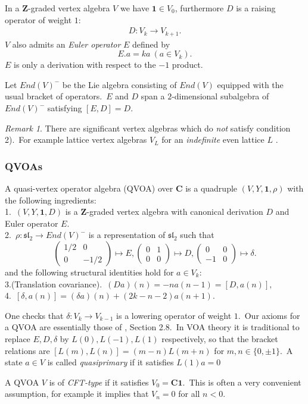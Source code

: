 \documentclass[12pt]{amsart}
\theoremstyle{plain}
\theoremstyle{definition}
\theoremstyle{remark}
\newtheorem{rmk}[thm]{Remark}
\providecommand{\stwomat}[4]{\left(\begin{smallmatrix}#1&#2\\#3&#4\end{smallmatrix}\right)}
\newcommand{\CC}{\mathbf{C}}
\newcommand{\ZZ}{\mathbf{Z}}
\begin{document}
\medskip
In a $\ZZ$-graded vertex algebra $V$ we have $\mathbf{1}\in V_0$, furthermore $D$ is a raising operator of weight $1$:
\begin{eqnarray*}
D: V_k\rightarrow V_{k+1}.
\end{eqnarray*}
$V$ also admits an \textit{Euler operator} $E$ defined by
$$ E.a = ka\ (a\in V_k).$$
$E$ is only a derivation with respect to the $-1$ product.

\medskip
 Let $End(V)^-$ be the Lie algebra consisting of $End(V)$ equipped with the usual bracket of operators.\  $E$ and $D$ span a $2$-dimensional subalgebra of $End(V)^-$ satisfying
$[E, D]=D.$\ 

\begin{rmk}
There are significant vertex algebras which do \textit{not} satisfy  condition 2).\
For example lattice vertex algebras $V_L$ for an \textit{indefinite} even lattice $L$ \cite{LepowskyLi}.
\end{rmk}
\subsubsection{QVOAs}\label{SSQVOA} A quasi-vertex operator algebra (QVOA) over $\CC$ is a quadruple $(V, Y, \mathbf{1}, \rho)$ with the following ingredients:\\
1.\ $(V, Y, \mathbf{1}, D)$ is a $\ZZ$-graded vertex algebra with canonical derivation $D$ and Euler operator $E$.\\
2.\ $\rho: \mathfrak{sl}_2\rightarrow End(V)^-$ is a representation of $\mathfrak{sl}_2$
such that 
$$\stwomat{1/2}{0}{0}{-1/2}\mapsto E, 
\stwomat{0}{1}{0}{0}\mapsto D,
\stwomat{0}{0}{-1}{0}\mapsto \delta.$$
and the following structural identities hold for $a\in V_k$:\\
3.(Translation covariance).\ $(Da)(n)= -na(n-1)=[D, a(n)],$\\
4.\   $[\delta, a(n)] = (\delta a)(n)+(2k-n-2)a(n+1)$.

\medskip
 One checks that $\delta: V_k\rightarrow V_{k-1}$ is a lowering operator of weight $1$.\
  Our axioms for a QVOA are essentially those of \cite{FHL}, Section 2.8.\
 In VOA theory it is traditional to replace
 $E, D, \delta$ by $L(0), L(-1), L(1)$ respectively, so that the bracket relations are $[L(m), L(n)]=(m-n)L(m+n)$ for $m, n\in\{0, \pm 1\}$.\ A state $a\in V$ is called \textit{quasiprimary} if it satisfies $L(1)a=0$

\medskip
A QVOA $V$ is of \textit{CFT-type} if it satisfies $V_0=\CC\mathbf{1}$.\ This is often a very convenient assumption, for example it implies \cite{DMshifted} that $V_n=0$ for all $n<0$.
\end{document}
